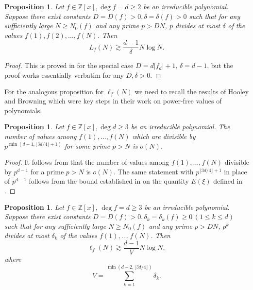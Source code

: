 \documentclass[alphabetic]{amsart}
\newtheorem{prop}[claim]{Proposition}
\theoremstyle{definition}
\numberwithin{equation}{section}
\newcommand{\Z}{{\mathbb Z}}
\numberwithin{equation}{section}
\begin{document}
\begin{prop}\label{prop: main1} Let $f\in\Z[x],\deg f=d\ge 2$ be an irreducible polynomial. Suppose there exist constants $D=D(f)>0, \delta=\delta(f)>0$ such that for any sufficiently large $N\ge N_0(f)$ and any prime $p>DN$, $p$ divides at most $\delta$ of the values $f(1),f(2),\ldots,f(N)$. Then
$$L_f(N)\gtrsim \frac{d-1}{\delta}N\log N.$$
\end{prop}

\begin{proof} 
This is proved in \cite[Proof of Theorem 1.3]{Sah20} for the special case $ D=d|f_d|+1,\,\delta=d-1$, but the proof works essentially verbatim for any $D,\delta>0$.\end{proof}

For the analogous proposition for $\ell_f(N)$ we need to recall the results of Hooley and Browning which were key steps in their work on power-free values of polynomials.

\begin{prop}\label{prop: k-free} Let $f\in\Z[x],\deg d\ge 3$ be an irreducible polynomial.
 The number of values among $f(1),\ldots,f(N)$ which are divisible by $p^{\min(d-1,\lfloor 3d/4\rfloor+1)}$ for some prime $p>N$ is $o(N)$.\end{prop}

\begin{proof} It follows from \cite[Equation (15)]{Hoo67} that the number of values among $f(1),\ldots,f(N)$ divisible by $p^{d-1}$ for a prime $p>N$ is $o(N)$. The same statement with $p^{\lfloor 3d/4\rfloor+1}$  in place of $p^{d-1}$ follows from the bound established in \cite[\S 3]{Bro11} on the quantity $E(\xi)$ defined in \cite[Equation (9)]{Bro11}.
\end{proof}

\begin{prop} Let $f\in\Z[x],\,\deg f=d\ge 3$ be an irreducible polynomial. \label{prop: main2} Suppose there exist constants $D=D(f)>0, \delta_k=\delta_k(f)\ge 0\,(1\le k\le d)$ such that for any sufficiently large $N\ge N_0(f)$ and any prime $p>DN$, $p^k$ divides at most $\delta_k$ of the values $f(1),\ldots,f(N)$. Then
$$\ell_f(N)\gtrsim \frac{d-1}{V}N\log N,$$
where \begin{equation}\label{eq: V}V=\sum_{k=1}^{\min(d-2,\lfloor 3d/4\rfloor)}\delta_k.\end{equation}
\end{prop}
\end{document}

